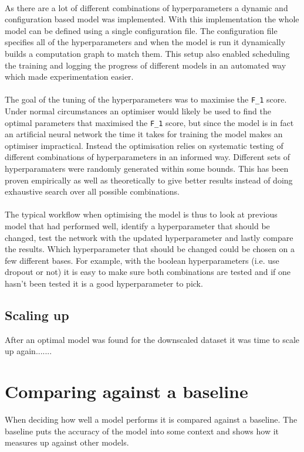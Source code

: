 \\
As there are a lot of different combinations of hyperparameters a dynamic and configuration based model was implemented. With this implementation the whole model can be defined using a single configuration file. The configuration file specifies all of the hyperparameters and when the model is run it dynamically builds a computation graph to match them. This setup also enabled scheduling the training and logging the progress of different models in an automated way which made experimentation easier.
\\\\
The goal of the tuning of the hyperparameters was to maximise the \texttt{F\_1} score. Under normal circumstances an optimiser would likely be used to find the optimal parameters that maximised the \texttt{F\_1} score, but since the model is in fact an artificial neural network the time it takes for training the model makes an optimiser impractical. Instead the optimisation relies on systematic testing of different combinations of hyperparameters in an informed way. Different sets of hyperparamaters were randomly generated within some bounds. This has been proven empirically as well as theoretically to give better results instead of doing exhaustive search over all possible combinations. \parencite{bergstra2012random}
\\\\
The typical workflow when optimising the model is thus to look at previous model that had performed well, identify a hyperparameter that should be changed, test the network with the updated hyperparameter and lastly compare the results. Which hyperparameter that should be changed could be chosen on a few different bases. For example, with the boolean hyperparameters (i.e. use dropout or not) it is easy to make sure both combinations are tested and if one hasn't been tested it is a good hyperparameter to pick.
\subsection{Scaling up}
After an optimal model was found for the downscaled dataset it was time to scale up again....... 
\section{Comparing against a baseline}
When deciding how well a model performs it is compared against a baseline. The baseline puts the accuracy of the model into some context and shows how it measures up against other models.
